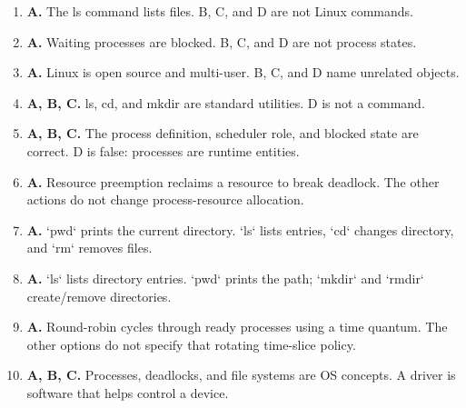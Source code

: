 \begin{enumerate}[label=\textbf{Q\arabic*.}, leftmargin=*]
\item \textbf{A.} The ls command lists files. B, C, and D are not Linux commands.
\item \textbf{A.} Waiting processes are blocked. B, C, and D are not process states.
\item \textbf{A.} Linux is open source and multi-user. B, C, and D name unrelated objects.
\item \textbf{A, B, C.} ls, cd, and mkdir are standard utilities. D is not a command.
\item \textbf{A, B, C.} The process definition, scheduler role, and blocked state are correct. D is false: processes are runtime entities.
\item \textbf{A.} Resource preemption reclaims a resource to break deadlock. The other actions do not change process-resource allocation.

\item \textbf{A.} `pwd` prints the current directory. `ls` lists entries, `cd` changes directory, and `rm` removes files.

\item \textbf{A.} `ls` lists directory entries. `pwd` prints the path; `mkdir` and `rmdir` create/remove directories.

\item \textbf{A.} Round-robin cycles through ready processes using a time quantum. The other options do not specify that rotating time-slice policy.

\item \textbf{A, B, C.} Processes, deadlocks, and file systems are OS concepts. A driver is software that helps control a device.

\end{enumerate}
